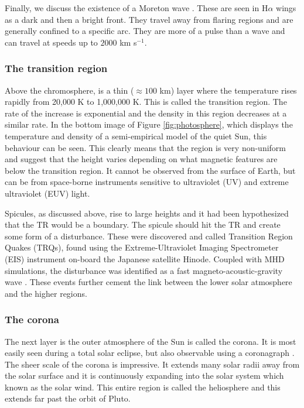     Finally, we discuss the existence of a Moreton wave \citep{1960AJ.....65U.494M}.
    These are seen in H$\alpha$ wings as a dark and then a bright front.
    They travel away from flaring regions and are generally confined to a specific arc.
    They are more of a pulse than a wave and can travel at speeds up to $2000$ km s$^{-1}$.
            
\subsubsection{The transition region}

    Above the chromosphere, is a thin ($\approx100$ km) layer where the temperature rises rapidly from 20,000 K to 1,000,000 K.
    This is called the transition region.
    The rate of the increase is exponential and the density in this region decreases at a similar rate.
    In the bottom image of Figure \ref{fig:photosphere}, which displays the temperature and density of a semi-empirical model of the quiet Sun, this behaviour can be seen.
    This clearly means that the region is very non-uniform and \cite{tian2009solar} suggest that the height varies depending on what magnetic features are below the transition region.
    It cannot be observed from the surface of Earth, but can be from space-borne instruments sensitive to ultraviolet (UV) and extreme ultraviolet (EUV) light.
    
    Spicules, as discussed above, rise to large heights and it had been hypothesized that the TR would be a boundary.
    The spicule should hit the TR and create some form of a disturbance.
    These were discovered and called Transition Region Quakes (TRQs), found using the Extreme-Ultraviolet Imaging Spectrometer (EIS) instrument on-board the Japanese satellite Hinode.
    Coupled with MHD simulations, the disturbance was identified as a fast magneto-acoustic-gravity wave \citep{0004-637X-743-1-14}.
    These events further cement the link between the lower solar atmosphere and the higher regions.
    
\subsubsection{The corona}

    The next layer is the outer atmosphere of the Sun is called the corona.
    It is most easily seen during a total solar eclipse, but also observable using a coronagraph \citep{markus2004physics}.
    The sheer scale of the corona is impressive.
    It extends many solar radii away from the solar surface and it is continuously expanding into the solar system which known as the solar wind.
    This entire region is called the heliosphere and this extends far past the orbit of Pluto.
    
